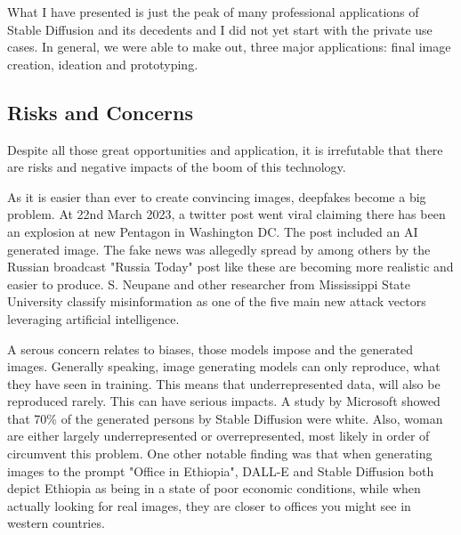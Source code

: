 \documentclass[11pt]{article}
\begin{document}
What I have presented is just the peak of many professional applications of Stable Diffusion and its decedents and I did not yet start with the private use cases. In general, we were able to make out, three major applications: final image creation, ideation and prototyping.

\subsection{Risks and Concerns}
Despite all those great opportunities and application, it is irrefutable that there are risks and negative impacts of the boom of this technology. 

As it is easier than ever to create convincing images, deepfakes become a big problem. At 22nd March 2023, a twitter post went viral claiming there has been an explosion at new Pentagon in Washington DC. The post included an AI generated image. The fake news was allegedly spread by among others by the Russian broadcast "Russia Today"\cite{correctiv2023pentagonexplosion} post like these are becoming more realistic and easier to produce. S. Neupane and other researcher from Mississippi State University\cite{neupane2023impactsriskgenerativeai} classify misinformation as one of the five main new attack vectors leveraging artificial intelligence. 

A serous concern relates to biases, those models impose and the generated images. Generally speaking, image generating models can only reproduce, what they have seen in training. This means that underrepresented data, will also be reproduced rarely. This can have serious impacts. A study by Microsoft\cite{naik2023socialbiasesthroughtexttoimage} showed that 70\% of the generated persons by Stable Diffusion were white. Also, woman are either largely underrepresented or overrepresented, most likely in order of circumvent this problem. One other notable finding was that when generating images to the prompt  "Office in Ethiopia", DALL-E and Stable Diffusion both depict Ethiopia as being in a state of poor economic conditions, while when actually looking for real images, they are closer to offices you might see in western countries. 
\end{document}
